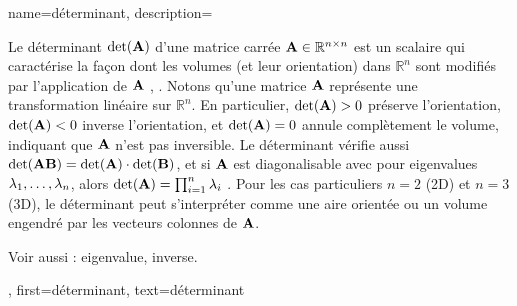 {
	name={déterminant},
	description={
		Le déterminant $\det({\bf A})$ d'une matrice carrée 
		${\bf A} \in \mathbb{R}^{n \times n}$ est un scalaire qui caractérise la façon dont les volumes (et leur orientation) dans $\mathbb{R}^n$ sont modifiés par l’application de ${\bf A}$ \cite{GolubVanLoanBook}, \cite{Strang2007}. 
		Notons qu’une matrice ${\bf A}$ représente une transformation linéaire sur $\mathbb{R}^{n}$. 
		En particulier, $\det({\bf A}) > 0$ préserve l’orientation, $\det({\bf A}) < 0$ inverse l’orientation, 
		et $\det({\bf A}) = 0$ annule complètement le volume, indiquant que ${\bf A}$ n’est pas inversible. 
		Le déterminant vérifie aussi $\det({\bf A} {\bf B}) = \det({\bf A}) \cdot \det({\bf B})$, et si ${\bf A}$ est 
		diagonalisable avec pour \glspl{eigenvalue} $\lambda_{1}, \ldots, \lambda_{n}$, alors $\det({\bf A}) = \prod_{i=1}^{n} \lambda_{i}$ \cite{HornMatAnalysis}.
		Pour les cas particuliers $n=2$ (2D) et $n=3$ (3D), le déterminant peut s’interpréter comme une aire orientée ou un volume engendré par les vecteurs colonnes de ${\bf A}$.
		\begin{figure}[H]
			\begin{center}
			\end{center}
		\end{figure}
		Voir aussi : \gls{eigenvalue}, \gls{inverse}.
	},
	first={déterminant},
	text={déterminant}
}

